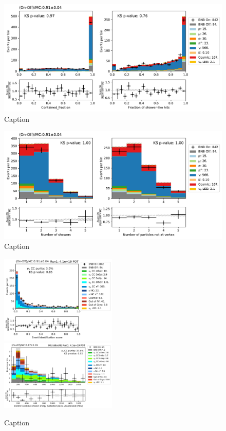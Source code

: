 \begin{figure}
    \centering
    \includegraphics[width=\textwidth]{NueCCsel/Images/run1/bdt_1.pdf}
    \caption{Caption}
    \label{fig:bdt_1}
\end{figure}

\begin{figure}
    \centering
    \includegraphics[width=\textwidth]{NueCCsel/Images/run1/bdt_2.pdf}
    \caption{Caption}
    \label{fig:bdt_2}
\end{figure}

\begin{figure}
    \centering
    \includegraphics[width=0.495\textwidth]{NueCCsel/Images/run1/pre_event_score.pdf}
    \includegraphics[width=0.495\textwidth]{NueCCsel/Images/run1/nue_shower_energy_y.pdf}
    \caption{Caption}
    \label{fig:pre_daughter_score}
\end{figure}


